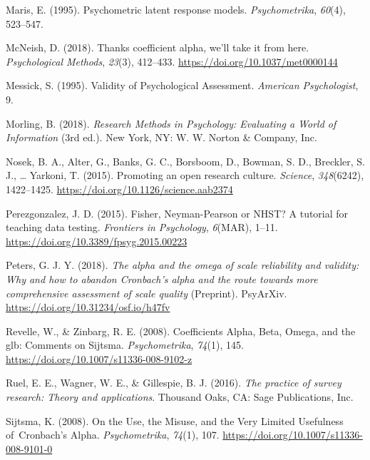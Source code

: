 \documentclass[
  english,
  man]{apa6}
\begin{document}
\leavevmode\hypertarget{ref-marisPsychometricLatentResponse1995}{}%
Maris, E. (1995). Psychometric latent response models. \emph{Psychometrika}, \emph{60}(4), 523--547.

\leavevmode\hypertarget{ref-mcneishThanksCoefficientAlpha2018}{}%
McNeish, D. (2018). Thanks coefficient alpha, we'll take it from here. \emph{Psychological Methods}, \emph{23}(3), 412--433. \url{https://doi.org/10.1037/met0000144}

\leavevmode\hypertarget{ref-messickValidityPsychologicalAssessment1995}{}%
Messick, S. (1995). Validity of Psychological Assessment. \emph{American Psychologist}, 9.

\leavevmode\hypertarget{ref-morlingResearchMethodsPsychology2018}{}%
Morling, B. (2018). \emph{Research Methods in Psychology: Evaluating a World of Information} (3rd ed.). New York, NY: W. W. Norton \& Company, Inc.

\leavevmode\hypertarget{ref-Nosek2015}{}%
Nosek, B. A., Alter, G., Banks, G. C., Borsboom, D., Bowman, S. D., Breckler, S. J., \ldots{} Yarkoni, T. (2015). Promoting an open research culture. \emph{Science}, \emph{348}(6242), 1422--1425. \url{https://doi.org/10.1126/science.aab2374}

\leavevmode\hypertarget{ref-Perezgonzalez2015}{}%
Perezgonzalez, J. D. (2015). Fisher, Neyman-Pearson or NHST? A tutorial for teaching data testing. \emph{Frontiers in Psychology}, \emph{6}(MAR), 1--11. \url{https://doi.org/10.3389/fpsyg.2015.00223}

\leavevmode\hypertarget{ref-petersAlphaOmegaScale2018}{}%
Peters, G. J. Y. (2018). \emph{The alpha and the omega of scale reliability and validity: Why and how to abandon Cronbach's alpha and the route towards more comprehensive assessment of scale quality} (Preprint). PsyArXiv. \url{https://doi.org/10.31234/osf.io/h47fv}

\leavevmode\hypertarget{ref-revelleCoefficientsAlphaBeta2008}{}%
Revelle, W., \& Zinbarg, R. E. (2008). Coefficients Alpha, Beta, Omega, and the glb: Comments on Sijtsma. \emph{Psychometrika}, \emph{74}(1), 145. \url{https://doi.org/10.1007/s11336-008-9102-z}

\leavevmode\hypertarget{ref-ruelPracticeSurveyResearch2016}{}%
Ruel, E. E., Wagner, W. E., \& Gillespie, B. J. (2016). \emph{The practice of survey research: Theory and applications}. Thousand Oaks, CA: Sage Publications, Inc.

\leavevmode\hypertarget{ref-sijtsmaUseMisuseVery2008}{}%
Sijtsma, K. (2008). On the Use, the Misuse, and the Very Limited Usefulness of~Cronbach's Alpha. \emph{Psychometrika}, \emph{74}(1), 107. \url{https://doi.org/10.1007/s11336-008-9101-0}
\end{document}
